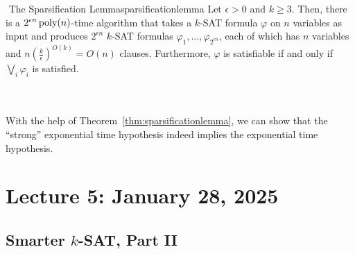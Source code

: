         \begin{theorem}{\Stop\,\,The Sparsification Lemma}{sparsificationlemma}
            Let \(\epsilon>0\) and \(k\geq3\). Then, there is a \(2^{\epsilon n}\operatorname{poly}(n)\)-time algorithm that takes a \(k\)-\textsc{SAT} formula \(\varphi\) on \(n\) variables as input and produces \(2^{\epsilon n}\) \(k\)-\textsc{SAT} formulas \(\varphi_1,\ldots,\varphi_{2^{\epsilon n}}\), each of which has \(n\) variables and \(n\left(\frac{k}{\epsilon}\right)^{O(k)}=O(n)\) clauses. Furthermore, \(\varphi\) is satisfiable if and only if \(\bigvee_i \varphi_i\) is satisfied.
        \end{theorem}
        \vphantom
        \\
        \\
        With the help of Theorem~\ref{thm:sparsificationlemma}, we can show that the ``strong'' exponential time hypothesis indeed implies the exponential time hypothesis.

\pagebreak

\section{Lecture 5: January 28, 2025}

    \subsection{Smarter \(k\)-SAT, Part II}

